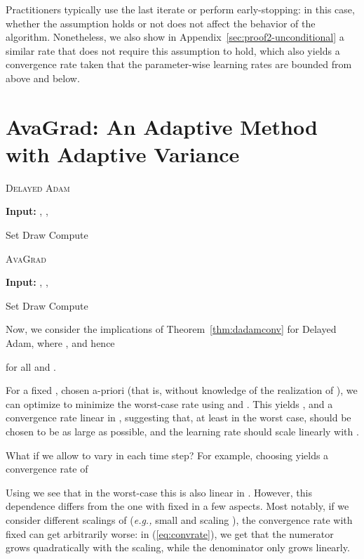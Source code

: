 \documentclass{article}
\newcommand{\eg}{\textit{e.g.,} }
\newcommand{\thmref}[1]{Theorem~\ref{#1}}
\renewcommand{\eqref}[1]{(\ref{#1})}
\begin{document}
Practitioners typically use the last iterate  or
perform early-stopping: in this case, whether the assumption holds or not does
not affect the behavior of the algorithm.  Nonetheless, we also show in
Appendix~\ref{sec:proof2-unconditional} a similar rate that does not require
this assumption to hold, which also yields a  convergence rate
taken that the parameter-wise learning rates are bounded from above and below.
 \section{AvaGrad: An Adaptive Method with Adaptive Variance}
\label{sec:ava}
\begin{algorithm}[t]
   \caption{\textsc{Delayed Adam}}
   \label{alg:dadam}
   \textbf{Input:}
      , , 
   \begin{algorithmic}[1]
      \State Set 
         \State Draw 
         \State Compute 
         \State 
         \State 
         \State 
         \State 
      \EndFor
   \end{algorithmic}
\end{algorithm}
 
\begin{algorithm}[t]
   \caption{\textsc{AvaGrad}}
   \label{alg:avagrad}
   \textbf{Input:}
      , , 
   \begin{algorithmic}[1]
      \State Set 
         \State Draw 
         \State Compute 
         \State 
         \State 
         \State 
         \State 
      \EndFor
   \end{algorithmic}
\end{algorithm}
 
Now, we consider the implications of \thmref{thm:dadamconv} for Delayed Adam,
where , and hence

for all  and .

For a fixed , chosen a-priori (that is, without knowledge of
the realization of ), we can optimize  to minimize
the worst-case rate using  and
.  This yields
, and a convergence rate linear in ,
suggesting that, at least in the worst case,  should be chosen to be
as large as possible, and the learning rate  should scale linearly with
.

What if we allow  to vary in each time step?  For example, choosing
 yields a convergence rate of

Using  we see
that in the worst-case this is also linear in . However, this dependence differs
from the one with fixed  in a few aspects.  Most notably, if
we consider different scalings of 
(\eg small  and scaling ), the convergence rate with fixed
 can get arbitrarily worse: in \eqref{eq:convrate}, we get that the numerator grows quadratically with the scaling, while the denominator only grows linearly.
\end{document}
